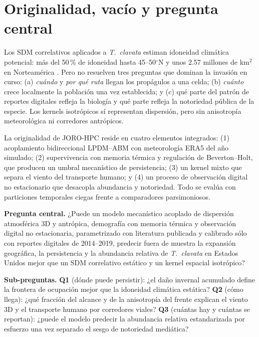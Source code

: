 \documentclass[11pt,letterpaper]{article}
\begin{document}
\section{Originalidad, vacío y pregunta central}
Los SDM correlativos aplicados a \textit{T.~clavata} \cite{nelsen2023,giulian2024} estiman idoneidad climática potencial: más del 50\,\% de idoneidad hasta 45--50$^\circ$N y unos 2.57 millones de km$^2$ en Norteamérica \cite{giulian2024}. Pero no resuelven tres preguntas que dominan la invasión en curso: (a) \emph{cuándo} y \emph{por qué ruta} llegan los propágulos a una celda; (b) \emph{cuánto} crece localmente la población una vez establecida; y (c) qué parte del patrón de reportes digitales refleja la biología y qué parte refleja la notoriedad pública de la especie. Los kernels isotrópicos sí representan dispersión, pero sin anisotropía meteorológica ni corredores antrópicos.

La originalidad de JORO-HPC reside en cuatro elementos integrados: (1) acoplamiento bidireccional LPDM--ABM con meteorología ERA5 del año simulado; (2) supervivencia con memoria térmica y regulación de Beverton--Holt, que producen un umbral mecanístico de persistencia; (3) un kernel mixto que separa el viento del transporte humano; y (4) un proceso de observación digital no estacionario que desacopla abundancia y notoriedad. Todo se evalúa con particiones temporales ciegas frente a comparadores parsimoniosos.

\textbf{Pregunta central.} ¿Puede un modelo mecanístico acoplado de dispersión atmosférica 3D y antrópica, demografía con memoria térmica y observación digital no estacionaria, parametrizado con literatura publicada y calibrado sólo con reportes digitales de 2014--2019, predecir fuera de muestra la expansión geográfica, la persistencia y la abundancia relativa de \textit{T.~clavata} en Estados Unidos mejor que un SDM correlativo estático y un kernel espacial isotrópico?

\textbf{Sub-preguntas.} \textbf{Q1} (dónde puede persistir): ¿el daño invernal acumulado define la frontera de ocupación mejor que la idoneidad climática estática? \textbf{Q2} (cómo llega): ¿qué fracción del alcance y de la anisotropía del frente explican el viento 3D y el transporte humano por corredores viales? \textbf{Q3} (cuántas hay y cuántas se reportan): ¿puede el modelo predecir la abundancia relativa estandarizada por esfuerzo una vez separado el sesgo de notoriedad mediática?

\end{document}

